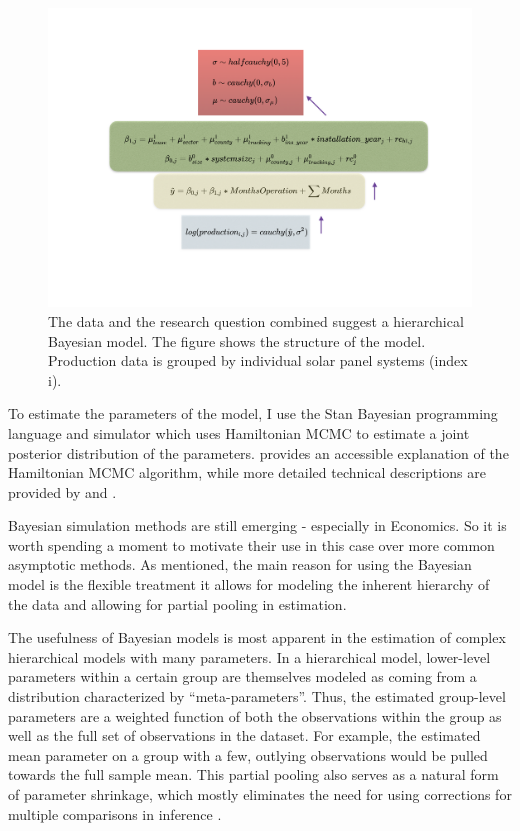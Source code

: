 \documentclass[12pt]{article}
\begin{document}
\begin{figure}
	\includegraphics[width=1\textwidth]{figures/solar_prod_bayes_diag.png}
	\caption{The data and the research question combined suggest a hierarchical Bayesian model. The figure shows the structure of the model. Production data is grouped by individual solar panel systems (index i).}
	\label{solar_prod_bayes_diag}
\end{figure}

To estimate the parameters of the model, I use the Stan Bayesian programming language and simulator \citep{stan_development_team_stan_2014} which uses Hamiltonian MCMC to estimate a joint posterior distribution of the parameters. \citet{kruschke_doing_2014} provides an accessible explanation of the Hamiltonian MCMC algorithm, while more detailed technical descriptions are provided by \citet{gelman_bayesian_2013} and \citet{stan_development_team_stan_2014}.

Bayesian simulation methods are still emerging - especially in Economics. So it is worth spending a moment to motivate their use in this case over more common asymptotic methods. As mentioned, the main reason for using the Bayesian model is the flexible treatment it allows for modeling the inherent hierarchy of the data and allowing for partial pooling in estimation.

The usefulness of Bayesian models is most apparent in the estimation of complex hierarchical models with many parameters.
In a hierarchical model, lower-level parameters within a certain group are themselves modeled as coming from a distribution characterized by ``meta-parameters''. Thus, the estimated group-level parameters are a weighted function of both the observations within the group as well as the full set of observations in the dataset. For example, the estimated mean parameter on a group with a few, outlying observations would be pulled towards the full sample mean. This partial pooling also serves as a natural form of parameter shrinkage, which mostly eliminates the need for using corrections for multiple comparisons in inference \citep{gelman_data_2006}.
\end{document}
